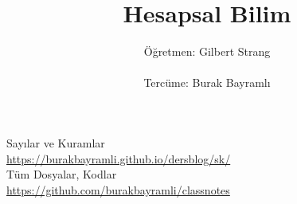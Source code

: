 \documentclass[12pt,a4paper]{report}
\title{Hesapsal Bilim}
\author{Öğretmen: Gilbert Strang \\ \\ Tercüme: Burak Bayramlı}
\date{}
\begin{document}
\maketitle

\newpage

\begin{figure}[!hbp]
\end{figure}


\vspace*{4cm}
\begin{center}
\vspace{0.5cm}
Sayılar ve Kuramlar\\
\vspace{0.5cm}
\url{https://burakbayramli.github.io/dersblog/sk/}\\
\vspace{0.5cm}
Tüm Dosyalar, Kodlar\\
\vspace{0.5cm}
\url{https://github.com/burakbayramli/classnotes}\\
\end{center}
\end{document}
